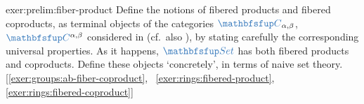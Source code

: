 \begin{exer}{\lnot}{exer:prelim:fiber-product}
  Define the notions of fibered products and fibered coproducts, as
  terminal objects of the categories $\categ{C}_{\alpha,\beta}$,
  $\categ{C}^{\alpha,\beta}$ considered in
   (cf.\ also
  ), by stating carefully the
  corresponding universal properties.  As it happens, $\categ{Set}$
  has both fibered products and coproducts. Define these objects
  `concretely', in terms of naive set theory.
  [\ref{exer:groups:ab-fiber-coproduct},~%
  \ref{exer:rings:fibered-product},~%
  \ref{exer:rings:fibered-coproduct}]
\end{exer}

 
